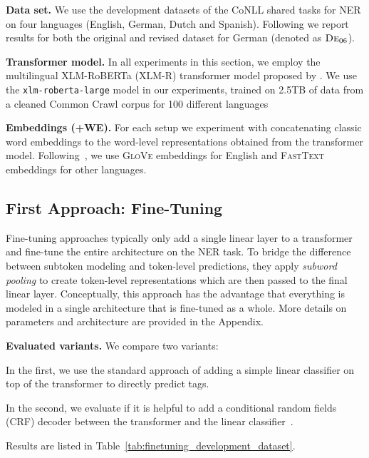 \noindent
\textbf{Data set.} We use the development datasets of the CoNLL shared tasks \citep{tjong-kim-sang-de-meulder-2003-introduction,tjong-kim-sang-2002-introduction} for NER on four languages (English, German, Dutch and Spanish). Following \citet{yu-etal-2020-named} we report results for both the original and revised dataset for German (denoted as $\textsc{De}_{06}$).

\noindent
\textbf{Transformer model.}
In all experiments in this section, we employ the multilingual XLM-RoBERTa (XLM-R) transformer model proposed by \citet{conneau2019unsupervised}. We use the \texttt{xlm-roberta-large} model in our experiments, trained on 2.5TB of data from a cleaned Common Crawl corpus \cite{wenzek-etal-2020-ccnet} for 100 different languages

\noindent
\textbf{Embeddings (+WE).}
For each setup we experiment with concatenating classic word embeddings to the word-level representations obtained from the transformer model. Following~\citet{akbik-etal-2018-contextual}, we use \textsc{GloVe} embeddings \citep{pennington-etal-2014-glove} for English and \textsc{FastText} embeddings \citep{bojanowski-etal-2017-enriching} for other languages.

\subsection{First Approach: Fine-Tuning}
\label{sec:fine_tuning}
\vspace{-1mm}

Fine-tuning approaches typically only add a single linear layer to a transformer and fine-tune the entire architecture on the NER task. To bridge the difference between subtoken modeling and token-level predictions, they apply \textit{subword pooling} to create token-level representations which are then passed to the final linear layer. Conceptually, this approach has the advantage that everything is modeled in a single architecture that is fine-tuned as a whole. More details on parameters and architecture are provided in the Appendix. 

\noindent 
\textbf{Evaluated variants.} 
We compare two variants: 

\begin{description}
\vspace{-1mm}
\item[Transformer-Linear] In the first, we use the standard approach of adding a simple linear classifier on top of the transformer to directly predict tags. 
\vspace{-1mm}
\item[Transformer-CRF] In the second, we evaluate if it is helpful to add a conditional random fields (CRF) decoder between the transformer and the linear classifier~\cite{souza2019portuguese}. 
\end{description}
\vspace{-1mm}
\noindent
Results are listed in Table~\ref{tab:finetuning_development_dataset}.

